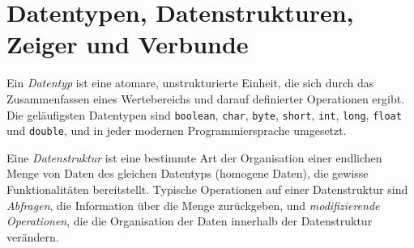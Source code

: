 \section{Datentypen, Datenstrukturen, Zeiger und Verbunde}
\label{sect:datenstrukturen}


\begin{bem}
Ein \emph{Datentyp} ist eine atomare, unstrukturierte Einheit, die sich durch das Zusammenfassen eines Wertebereichs und darauf definierter Operationen ergibt.
Die geläufigsten Datentypen sind \texttt{boolean}, \texttt{char}, \texttt{byte}, \texttt{short}, \texttt{int}, \texttt{long}, \texttt{float} und \texttt{double}, und in jeder modernen Programmiersprache umgesetzt.
\end{bem} 

\begin{bem}
Eine \emph{Datenstruktur} ist eine bestimmte Art der Organisation einer endlichen Menge von Daten des gleichen Datentyps (homogene Daten), die gewisse Funktionalitäten bereitstellt.
Typische Operationen auf einer Datenstruktur sind \emph{Abfragen}, die Information über die Menge zurückgeben, und \emph{modifizierende Operationen}, die die Organisation der Daten innerhalb der Datenstruktur verändern.
\end{bem} 

